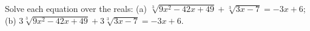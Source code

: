 Solve each equation over the reals: (a) $\sqrt[3]{9x^2-42x+49}+\sqrt[3]{3x-7}=-3x+6$; (b) $3\sqrt[3]{9x^2-42x+49}+3\sqrt[3]{3x-7}=-3x+6$.

